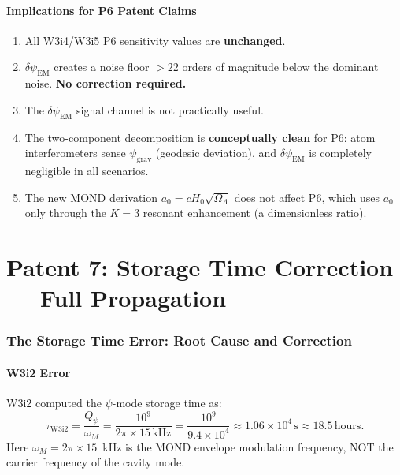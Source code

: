 \documentclass[11pt]{article}
\theoremstyle{definition}
\theoremstyle{remark}
\newcommand{\ee}[1]{\times10^{#1}}
\newcommand{\Qpsi}{Q_\psi}
\newcommand{\psigrav}{\psi_{\mathrm{grav}}}
\newcommand{\dpsiem}{\delta\psi_{\mathrm{EM}}}
\begin{document}
\subsection{Implications for P6 Patent Claims}

\begin{tcolorbox}[colback=green!5!white, colframe=green!40!black,
  title=P6 Two-Component Summary]
\begin{enumerate}[nosep]
\item All W3i4/W3i5 P6 sensitivity values are \textbf{unchanged}.
\item $\dpsiem$ creates a noise floor $> 22$ orders of magnitude below
  the dominant noise. \textbf{No correction required.}
\item The $\dpsiem$ signal channel is not practically useful.
\item The two-component decomposition is \textbf{conceptually clean}
  for P6: atom interferometers sense $\psigrav$ (geodesic deviation),
  and $\dpsiem$ is completely negligible in all scenarios.
\item The new MOND derivation $a_0 = cH_0\sqrt{\Omega_\Lambda}$ does not
  affect P6, which uses $a_0$ only through the $K=3$ resonant enhancement
  (a dimensionless ratio).
\end{enumerate}
\end{tcolorbox}

\part{Patent 7: Storage Time Correction --- Full Propagation}
\label{part:P7}

\section{The Storage Time Error: Root Cause and Correction}
\label{sec:P7-correction}

\subsection{W3i2 Error}

W3i2 computed the $\psi$-mode storage time as:
\begin{equation}
\tau_{\mathrm{W3i2}} = \frac{\Qpsi}{\omega_M}
= \frac{10^9}{2\pi \times 15\,\mathrm{kHz}}
= \frac{10^9}{9.4\ee{4}}
\approx 1.06\ee{4}\,\mathrm{s}
\approx 18.5\,\mathrm{hours}.
\label{eq:tau-wrong}
\end{equation}
Here $\omega_M = 2\pi \times 15$~kHz is the MOND envelope modulation
frequency, NOT the carrier frequency of the cavity mode.
\end{document}
